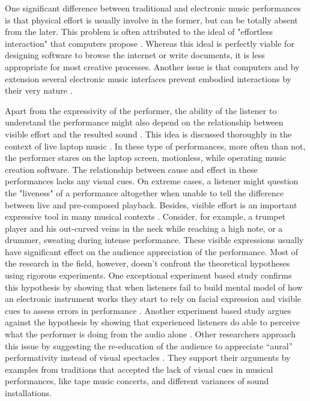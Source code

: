 \documentclass{sigchi}
\begin{document}
One significant difference between traditional and electronic music performances is that physical effort is usually involve in the former, but can be totally absent from the later.
This problem is often attributed to the ideal of "effortless interaction" that computers propose \cite{Ryan1992}.
Whereas this ideal is perfectly viable for designing software to browse the internet or write documents, it is less appropriate for most creative processes.
Another issue is that computers and by extension several electronic music interfaces prevent embodied interactions by their very nature \cite{Armstrong2006}.

Apart from the expressivity of the performer, the ability of the listener to understand the performance might also depend on the relationship between visible effort and the resulted sound \cite{Verdonk2015}.
This idea is discussed thoroughly in the context of live laptop music \cite{Schloss2003}.
In these type of performances, more often than not, the performer stares on the laptop screen, motionless, while operating music creation software.
The relationship between cause and effect in these performances lacks any visual cues.
On extreme cases, a listener might question the "liveness" of a performance altogether when unable to tell the difference between live and pre-composed playback.
Besides, visible effort is an important expressive tool in many musical contexts \cite{Schloss2003}.
Consider, for example, a trumpet player and his out-curved veins in the neck while reaching a high note, or a drummer, sweating during intense performance.
These visible expressions usually have significant effect on the audience appreciation of the performance.
Most of the research in the field, however, doesn't confront the theoretical hypotheses using rigorous experiments.
One exceptional experiment based study confirms this hypothesis by showing that when listeners fail to build mental model of how an electronic instrument works they start to rely on facial expression and visible cues to assess errors in performance \cite{Fyans2010}.
Another experiment based study argues against the hypothesis by showing that experienced listeners do able to perceive what the performer is doing from the audio alone \cite{Bown2014}.
Other researchers approach this issue by suggesting the re-education of the audience to appreciate ``aural'' performativity instead of visual spectacles \cite{Stuart2003}.
They support their arguments by examples from traditions that accepted the lack of visual cues in musical performances, like tape music concerts, and different variances of sound installations.
\end{document}
